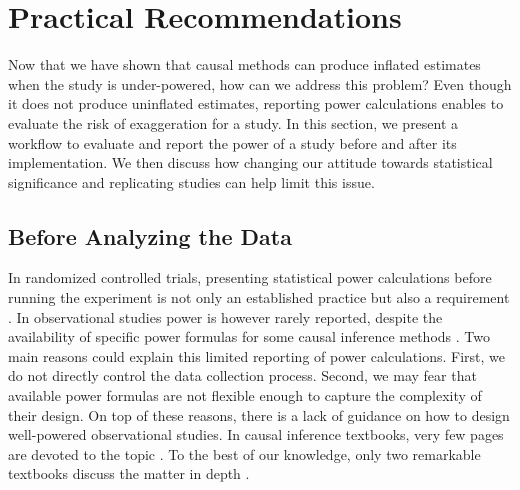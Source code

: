 \documentclass[12pt]{article}
\begin{document}

\section{Practical Recommendations} \label{discussion}

    Now that we have shown that causal methods can produce inflated estimates when the study is under-powered, how can we address this problem? Even though it does not produce uninflated estimates, reporting power calculations enables to evaluate the risk of exaggeration for a study. In this section, we present a workflow to evaluate and report the power of a study before and after its implementation. We then discuss how changing our attitude towards statistical significance and replicating studies can help limit this issue.

\subsection{Before Analyzing the Data}

    In randomized controlled trials, presenting statistical power calculations before running the experiment is not only an established practice but also a requirement  \citep{duflo_using_2007, mcconnell_going_2015, athey_econometrics_2016}. In observational studies power is however rarely reported, despite the availability of specific power formulas for some causal inference methods \citep{freeman_power_2013, cattaneo_power_2019}. Two main reasons could explain this limited reporting of power calculations. First, we do not directly control the data collection process. Second, we may fear that available power formulas are not flexible enough to capture the complexity of their design. On top of these reasons, there is a lack of guidance on how to design well-powered observational studies. In causal inference textbooks, very few pages are devoted to the topic \citep{angrist_mostly_2009, angrist_mastering_2014, imbens_causal_2015, cunningham_causal_2021}. To the best of our knowledge, only two remarkable textbooks discuss the matter in depth \citep{shadish_experimental_2002, huntington-klein_effect_2021}.
    
\end{document}
